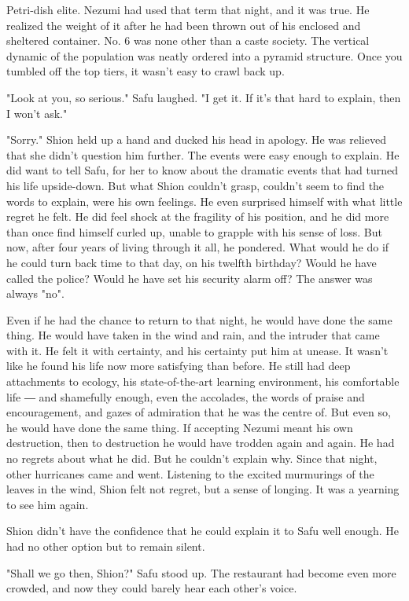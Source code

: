 Petri-dish elite. Nezumi had used that term that night, and it was true.
He realized the weight of it after he had been thrown out of his
enclosed and sheltered container. No. 6 was none other than a caste
society. The vertical dynamic of the population was neatly ordered into
a pyramid structure. Once you tumbled off the top tiers, it wasn't easy
to crawl back up.

"Look at you, so serious." Safu laughed. "I get it. If it's that hard to
explain, then I won't ask."

"Sorry." Shion held up a hand and ducked his head in apology. He was
relieved that she didn't question him further. The events were easy
enough to explain. He did want to tell Safu, for her to know about the
dramatic events that had turned his life upside-down. But what Shion
couldn't grasp, couldn't seem to find the words to explain, were his own
feelings. He even surprised himself with what little regret he felt. He
did feel shock at the fragility of his position, and he did more than
once find himself curled up, unable to grapple with his sense of loss.
But now, after four years of living through it all, he pondered. What
would he do if he could turn back time to that day, on his twelfth
birthday? Would he have called the police? Would he have set his
security alarm off? The answer was always "no".~

Even if he had the chance to return to that night, he would have done
the same thing. He would have taken in the wind and rain, and the
intruder that came with it. He felt it with certainty, and his certainty
put him at unease. It wasn't like he found his life now more satisfying
than before. He still had deep attachments to ecology, his
state-of-the-art learning environment, his comfortable life ― and
shamefully enough, even the accolades, the words of praise and
encouragement, and gazes of admiration that he was the centre of. But
even so, he would have done the same thing. If accepting Nezumi meant
his own destruction, then to destruction he would have trodden again and
again. He had no regrets about what he did. But he couldn't explain why.
Since that night, other hurricanes came and went. Listening to the
excited murmurings of the leaves in the wind, Shion felt not regret, but
a sense of longing. It was a yearning to see him again.

Shion didn't have the confidence that he could explain it to Safu well
enough. He had no other option but to remain silent.

"Shall we go then, Shion?" Safu stood up. The restaurant had become even
more crowded, and now they could barely hear each other's voice.

